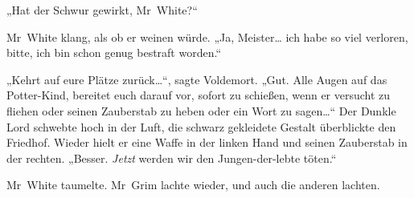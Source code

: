 „Hat der Schwur gewirkt, Mr~White?“

Mr~White klang, als ob er weinen würde.
„Ja, Meister… ich habe so viel verloren, bitte, ich bin schon genug bestraft worden.“

„Kehrt auf eure Plätze zurück…“, sagte Voldemort.
„Gut. Alle Augen auf das Potter-Kind, bereitet euch darauf vor, sofort zu schießen, wenn er versucht zu fliehen oder seinen Zauberstab zu heben oder ein Wort zu sagen…“
Der Dunkle Lord schwebte hoch in der Luft, die schwarz gekleidete Gestalt überblickte den Friedhof. Wieder hielt er eine Waffe in der linken Hand und seinen Zauberstab in der rechten.
„Besser. \emph{Jetzt} werden wir den Jungen-der-lebte töten.“

Mr~White taumelte. Mr~Grim lachte wieder, und auch die anderen lachten.

